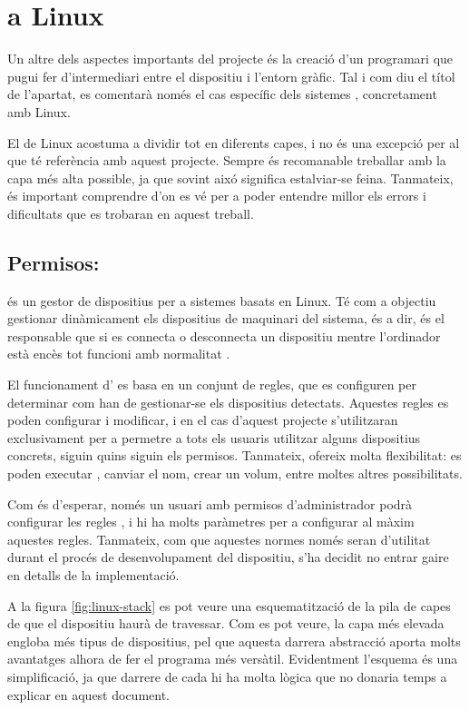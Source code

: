 \section{ a Linux}

Un altre dels aspectes importants del projecte és la creació d'un programari
que pugui fer d'intermediari entre el dispositiu i l'entorn gràfic. Tal i com
diu el títol de l'apartat, es comentarà només el cas específic dels sistemes
, concretament amb Linux.

El  de Linux acostuma a dividir tot en diferents capes, i no és una
excepció per al que té referència amb aquest projecte. Sempre és recomanable
treballar amb la capa més alta possible, ja que sovint aixó significa
estalviar-se feina. Tanmateix, és important comprendre d'on es vé per a
poder entendre millor els errors i dificultats que es trobaran en aquest treball.

\subsection{Permisos: }

 és un gestor de dispositius per a sistemes basats en Linux.
Té com a objectiu gestionar dinàmicament els dispositius de maquinari del
sistema, és a dir, és el responsable que si es connecta o desconnecta
un dispositiu mentre l'ordinador està encès tot funcioni amb normalitat \cite{Udev}.

El funcionament d' es basa en un conjunt de regles,
que es configuren per
determinar com han de gestionar-se els dispositius detectats.
Aquestes regles es poden configurar i modificar, i en el cas d'aquest projecte
s'utilitzaran exclusivament per a permetre a tots els usuaris utilitzar alguns
dispositius concrets, siguin quins siguin els permisos. Tanmateix, 
ofereix molta flexibilitat: es poden executar , canviar el nom,
crear un volum, entre moltes altres possibilitats.

Com és d'esperar, només un usuari amb permisos d'administrador podrà configurar
les regles , i hi ha molts paràmetres per a configurar al màxim
aquestes regles. Tanmateix, com que aquestes normes només seran d'utilitat durant
el procés de desenvolupament del dispositiu, s'ha decidit no entrar gaire en
detalls de la implementació.

A la figura \ref{fig:linux-stack} es pot veure una esquematització de la pila
de capes de  que el dispositiu haurà de travessar. Com es pot
veure, la capa més elevada engloba més tipus de dispositius, pel que aquesta
darrera abstracció aporta molts avantatges alhora de fer el programa més
versàtil. Evidentment l'esquema és una simplificació, ja que darrere de cada
 hi ha molta lògica que no donaria temps a explicar en aquest
document.

